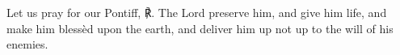 \begin{enpars} Let us pray for our Pontiff, \nomen{} ℟. The Lord preserve him, and give him life, and make him blessèd upon the earth, and deliver him up not up to the will of his enemies.
\end{enpars}